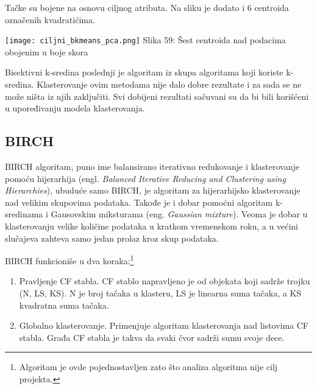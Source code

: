 \documentclass[a4paper]{article}
\begin{document}
{\noindent\begin{minipage}{0.45\textwidth}
Tačke su bojene na osnovu ciljnog atributa. Na sliku je dodato i 6 centroida označenih kvadratićima.\\
\end{minipage}
\noindent\begin{minipage}{0.01\textwidth}
\hphantom{a}
\end{minipage}
\noindent\begin{minipage}{0.6\textwidth}
\texttt{[image: ciljni\_bkmeans\_pca.png]}
Slika 59: Šest centroida nad podacima obojenim u boje skora\\
\end{minipage}

Bisektivni k-sredina poslednji je algoritam iz skupa algoritama koji koriste k-sredina. Klasterovanje ovim metodama nije dalo dobre rezultate i za sada se ne može ništa iz njih zaključiti. Svi dobijeni rezultati sačuvani su da bi bili korišćeni u upoređivanju modela klasterovanja.\\

\subsection{BIRCH}
\label{rf}

\noindent\begin{minipage}{0.45\textwidth}
BIRCH algoritam, puno ime balansirano iterativno redukovanje i klasterovanje pomoću hijerarhija (engl. {\em Balanced Iterative Reducing and Clustering using Hierarchies}), ubuduće samo BIRCH, je algoritam za hijerarhijsko klasterovanje nad velikim skupovima podataka. Takođe je i dobar pomoćni algoritam k-sredinama i Gausovskim miksturama (eng. {\em Gaussian mixture}). Veoma je dobar u klasterovanju velike količine podataka u kratkom vremenskom roku, a u većini slučajeva zahteva samo jedan prolaz kroz skup podataka.

BIRCH funkcioniše u dva koraka:\footnote[8]{Algoritam je ovde pojednostavljen zato što analiza algoritma nije cilj projekta.}

\begin{enumerate}
\item Pravljenje CF stabla. CF stablo napravljeno je od objekata koji sadrže trojku (N, LS, KS). N je broj tačaka u klasteru, LS je linearna suma tačaka, a KS kvadratna suma tačaka.
\item Globalno klasterovanje. Primenjuje algoritam klasterovanja nad listovima CF stabla. Građa CF stabla je takva da svaki čvor sadrži sumu svoje dece.
\end{enumerate}


\end{minipage}}
\end{document}
